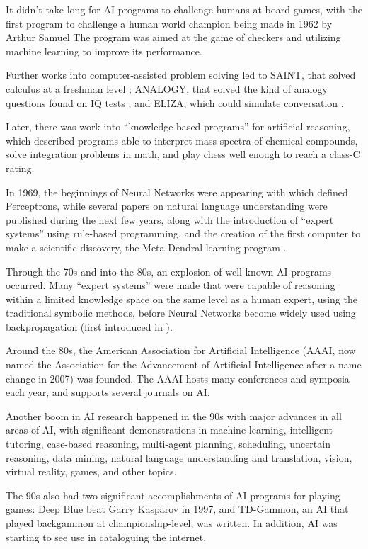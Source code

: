 \documentclass[]{report}
\begin{document}
It didn't take long for AI programs to challenge humans at board games, with the
first program to challenge a human world champion being made in 1962 by Arthur
Samuel The program was aimed at the game of checkers and utilizing machine
learning to improve its performance.

Further works into computer-assisted problem solving led to SAINT, that solved
calculus at a freshman level \citep{slagle1963heuristic}; ANALOGY, that solved
the kind of analogy questions found on IQ tests \citet{evans1964program}; and
ELIZA, which could simulate conversation \citep{weizenbaum1966eliza}.

Later, there was work into ``knowledge-based programs'' for artificial
reasoning, which described programs able to interpret mass spectra of chemical
compounds, solve integration problems in math, and play chess well enough to
reach a class-C rating.

In 1969, the beginnings of Neural Networks were appearing with
\citet{minsky1969perceptrons} which defined Perceptrons, while several papers on
natural language understanding were published during the next few years, along
with the introduction of ``expert systems'' using rule-based programming, and
the creation of the first computer to make a scientific discovery, the
Meta-Dendral learning program \citep{buchanan1976applications}.

Through the 70s and into the 80s, an explosion of well-known AI programs
occurred. Many ``expert systems'' were made that were capable of reasoning
within a limited knowledge space on the same level as a human expert, using the
traditional symbolic methods, before Neural Networks become widely used using
backpropagation (first introduced in \citet{werbos1974beyond}).

Around the 80s, the American Association for Artificial Intelligence (AAAI, now
named the Association for the Advancement of Artificial Intelligence after a
name change in 2007) was founded. The AAAI hosts many conferences and symposia
each year, and supports several journals on AI.

Another boom in AI research happened in the 90s with major advances in all areas
of AI, with significant demonstrations in machine learning, intelligent
tutoring, case-based reasoning, multi-agent planning, scheduling, uncertain
reasoning, data mining, natural language understanding and translation, vision,
virtual reality, games, and other topics.

The 90s also had two significant accomplishments of AI programs for playing
games: Deep Blue beat Garry Kasparov in 1997, and TD-Gammon, an AI that played
backgammon at championship-level, was written. In addition, AI was starting to
see use in cataloguing the internet.
\end{document}
